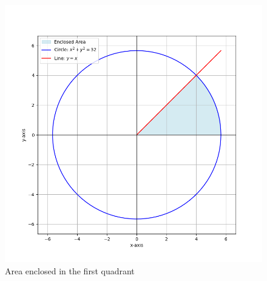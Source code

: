 \documentclass[journal]{IEEEtran}
\begin{document}
\begin{figure}[ht]
    \centering
    \includegraphics[width=\linewidth]{figs/9-9.2-41.png}
    \caption{Area enclosed in the first quadrant}
\end{figure}
  
\end{document}
